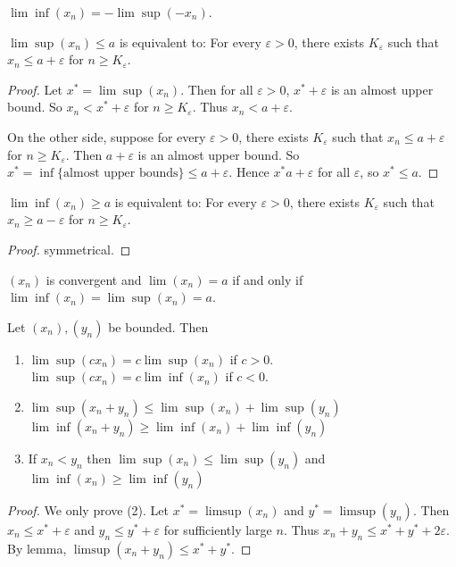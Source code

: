 
\begin{remark}
	$\lim\inf(x_n) = - \lim\sup(-x_n)$.
\end{remark}
\begin{lemma}
	$\lim\sup (x_n)\le a$ is equivalent to: For every $\varepsilon>0$, there exists $K_\varepsilon$ such that $x_n \le  a + \varepsilon$ for $n \ge  K _\varepsilon$.
\end{lemma}
\begin{proof}
	Let $x^* = \lim\sup (x_n)$. Then for all $\varepsilon>0$, $x^* + \varepsilon$ is an almost upper bound. So $x_n < x^* + \varepsilon$ for $n \ge K_\varepsilon$. Thus $x_n < a + \varepsilon$.

	On the other side, suppose for every $\varepsilon>0$, there exists $K_\varepsilon$ such that $x_n \le  a + \varepsilon$ for $n \ge  K _\varepsilon$. Then $a + \varepsilon$ is an almost upper bound. So $x^* = \operatorname{inf} \{\text{almost upper bounds}\} \le a + \varepsilon$. Hence $x^* a + \varepsilon$ for all $\varepsilon$, so $x^* \le a$.
\end{proof}


\begin{lemma}
	$\lim\inf (x_n)\ge a$ is equivalent to: For every $\varepsilon>0$, there exists $K_\varepsilon$ such that $x_n \ge  a - \varepsilon$ for $n \ge  K _\varepsilon$.
\end{lemma}
\begin{proof}
	symmetrical.
\end{proof}

\begin{corollary}
	$(x_n)$ is convergent and $\lim(x_n) = a$ if and only if $\lim\inf(x_n) = \lim\sup(x_n) = a$.
\end{corollary}

\begin{proposition}
	Let $(x_n), (y_n)$ be bounded. Then
	\begin{enumerate}
		\item $\lim\sup(c x_n) = c \lim\sup (x_n)$ if $c > 0$. \\
		$\lim\sup(c x_n) = c \lim\inf (x_n)$ if $c < 0$. 
	\item $\lim\sup (x_n + y_n) \le  \lim\sup(x_n) + \lim\sup(y_n)$\\
	 $\lim\inf (x_n + y_n) \ge  \lim\inf(x_n) + \lim\inf(y_n)$
 \item If $x_n < y_n $ then $\lim\sup(x_n) \le \lim\sup(y_n)$ and  $\lim\inf(x_n) \ge \lim\inf(y_n)$
	\end{enumerate}
\end{proposition}
\begin{proof}
	We only prove (2). Let $x^* = \limsup (x_n) $ and $y^* = \limsup (y_n)$. Then $x_n \le x^* + \varepsilon$ and $y_n \le y^* + \varepsilon$ for sufficiently large $n$. Thus $x_n + y_n \le  x^* + y^* + 2 \varepsilon$. By lemma, $\limsup (x_n + y_n)\le  x^* + y^*$.
\end{proof}

